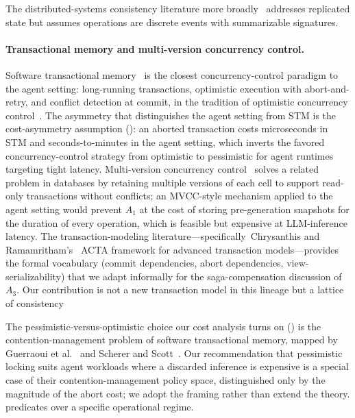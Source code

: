 \documentclass[journal,compsoc,10pt]{IEEEtran}
\providecommand{\citep}{\cite}
\theoremstyle{definition}
\theoremstyle{remark}
\begin{document}
The distributed-systems consistency literature more
broadly~\citep{LloydEtAl2011COPS,MahajanEtAl2011,TerryEtAl1994,Burckhardt2014,ShapiroEtAl2011CRDT}
addresses replicated state but assumes operations are discrete
events with summarizable signatures.

\paragraph{Transactional memory and multi-version concurrency
control.} Software transactional memory~\citep{ShavitTouitou1995STM,
HerlihyMoss1993TM} is the closest concurrency-control paradigm to
the agent setting: long-running transactions, optimistic execution
with abort-and-retry, and conflict detection at commit, in the
tradition of optimistic concurrency control~\citep{KungRobinson1981OCC}. The
asymmetry that distinguishes the agent setting from STM is the
cost-asymmetry assumption (): an aborted
transaction costs microseconds in STM and seconds-to-minutes in the
agent setting, which inverts the favored concurrency-control
strategy from optimistic to pessimistic for agent runtimes
targeting tight latency. Multi-version concurrency
control~\citep{BernsteinGoodman1983MVCC} solves a related problem
in databases by retaining multiple versions of each cell to support
read-only transactions without conflicts; an MVCC-style mechanism
applied to the agent setting would prevent $A_1$ at the cost of
storing pre-generation snapshots for the duration of every
operation, which is feasible but expensive at LLM-inference
latency. The transaction-modeling
literature---specifically~Chrysanthis and Ramamritham's~\cite{ChrysanthisRamamritham1992ACTA}
ACTA framework for advanced transaction models---provides the
formal vocabulary (commit dependencies, abort dependencies,
view-serializability) that we adapt informally for the
saga-compensation discussion of $A_3$. Our contribution is not a
new transaction model in this lineage but a lattice of consistency

The pessimistic-versus-optimistic choice our cost analysis turns on
() is the contention-management problem of
software transactional memory, mapped by Guerraoui et
al.~\citep{GuerraouiHerlihyPochon2005} and Scherer and
Scott~\citep{SchererScott2005}. Our recommendation that pessimistic
locking suits agent workloads where a discarded inference is expensive is
a special case of their contention-management policy space, distinguished
only by the magnitude of the abort cost; we adopt the framing rather than
extend the theory.
predicates over a specific operational regime.
\end{document}
